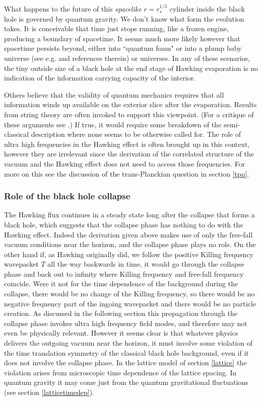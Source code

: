 \documentclass[12pt]{article}
\begin{document}
What happens to the future of this {\it spacelike} 
$r=r_s^{1/3}$ cylinder inside the black hole  
is governed by quantum gravity. 
We don't know what form the evolution takes. It is 
conceivable that time just stops running, like a frozen engine,
producing a boundary of spacetime. It seems much more likely however
that spacetime persists beyond, either into ``quantum foam" or into 
a plump baby universe 
(see e.g. \cite{Dymnikova:2003vt} and references therein) 
or universes\cite{Barrabes:1995nk}.
In any of these scenarios, the tiny outside size of a black hole 
at the end stage of Hawking evaporation 
is no indication of the information carrying capacity of the 
interior. 

Others believe that
the validity of quantum mechanics requires that all information 
winds up available on the exterior slice after the evaporation. 
Results from string theory are often invoked to support this
viewpoint. (For a critique of these arguments see \cite{TJBHentropy}.)
If true, it would require some breakdown of the semi-classical description 
where none seems to be otherwise called for.
The role of ultra high frequencies in the Hawking effect
is often brought up in this context, however they are
irrelevant since the derivation of the correlated structure of
the vacuum and the Hawking effect does not need
to access those frequencies. For more on this see the
discussion of the trans-Planckian question in section \ref{tpq}.

\subsubsection{Role of the black hole collapse}
\label{collapse}

The Hawking flux continues in a steady state long after the collapse
that forms a black hole, which suggests that the collapse phase 
has nothing to do with the Hawking effect. Indeed the derivation
given above makes use of only the free-fall vacuum conditions
near the horizon, and the collapse phase plays no role.
On the other hand if, as Hawking originally did, we follow the
positive Killing frequency 
wavepacket $T$ all the way backwards in time, it would go through the 
collapse phase and back out to infinity where Killing frequency and 
free-fall frequency coincide. Were it not for the time dependence
of the background during the collapse, there would be no change of
the Killing frequency, so there would be no negative frequency 
part of the ingoing wavepacket and there would be no particle
creation. As discussed in the following section this propagation
through the collapse phase invokes  ultra high frequency
field modes, and therefore may  not even be physically
relevant. However it seems clear is that whatever physics
delivers the outgoing vacuum near the horizon, it must involve
some violation of the time translation symmetry of the
classical black hole background, even if it does not 
involve the collapse phase. In the lattice model of 
section \ref{lattice} the violation arises from microscopic time
dependence of the lattice spacing. In quantum gravity
it may come just from the quantum gravitational fluctuations
(see section \ref{latticetimedep}).
\end{document}
